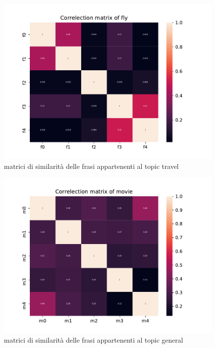 \begin{figure}[h!t]
    \centering
    \includegraphics{Figure/simMatr/fly.pdf}
    \caption{matrici di similarità delle frasi appartenenti al topic travel}
    \label{fig:mtrsim_t}
\end{figure}
\FloatBarrier

\begin{figure}[h!t]
    \centering
    \includegraphics{Figure/simMatr/movie.pdf}
    \caption{matrici di similarità delle frasi appartenenti al topic general}
    \label{fig:mtrsim_g}
\end{figure}
\FloatBarrier


